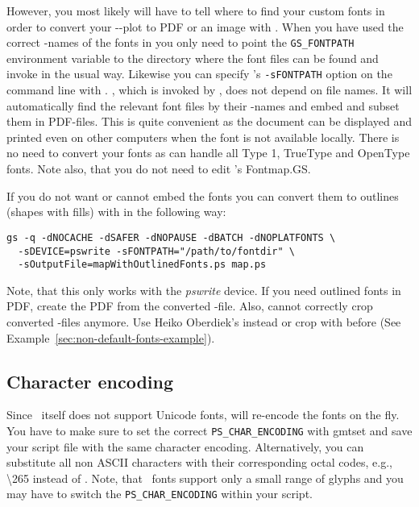 However, you most likely will have to tell 
where to find your custom fonts in order to convert your
\GMT-\PS-plot to PDF or an image with . When
you have used the correct \PS-names of the fonts in
 you only need to point the
\verb#GS_FONTPATH# environment variable to the directory where the
font files can be found and invoke  in the
usual way. Likewise you can specify 's
\verb#-sFONTPATH# option on the command line with
.  ,
which is invoked by , does not depend on file
names. It will automatically find the relevant font files by their
\PS-names and embed and subset them in PDF-files. This is quite
convenient as the document can be displayed and printed even on
other computers when the font is not available locally. There is
no need to convert your fonts as  can handle
all Type 1, TrueType and OpenType fonts. Note also, that you do
not need to edit 's Fontmap.GS.

If you do not want or cannot embed the fonts you can convert them
to outlines (shapes with fills) with  in the
following way:
\begin{verbatim}
gs -q -dNOCACHE -dSAFER -dNOPAUSE -dBATCH -dNOPLATFONTS \
  -sDEVICE=pswrite -sFONTPATH="/path/to/fontdir" \
  -sOutputFile=mapWithOutlinedFonts.ps map.ps
\end{verbatim}
Note, that this only works with the \emph{pswrite} device. If you
need outlined fonts in PDF, create the PDF from the converted
\PS-file.  Also, \GMTprog{ps2raster} cannot correctly crop
\progname{Ghostscript} converted \PS-files anymore. Use Heiko
Oberdiek's
instead or crop with \GMTprog{ps2raster} \Opt{A} \Opt{Te} before
(See Example~\ref{sec:non-default-fonts-example}).


\subsection{Character encoding}

Since \PS\ itself does not support Unicode fonts,  will
re-encode the fonts on the fly. You have to make sure to set the
correct \verb#PS_CHAR_ENCODING# with gmtset and save your script
file with the same character encoding. Alternatively, you can
substitute all non ASCII characters with their corresponding octal
codes, e.g., \textbackslash 265 instead of \textmu. Note, that
\PS\ fonts support only a small range of glyphs and you may have
to switch the \verb#PS_CHAR_ENCODING# within your script.

